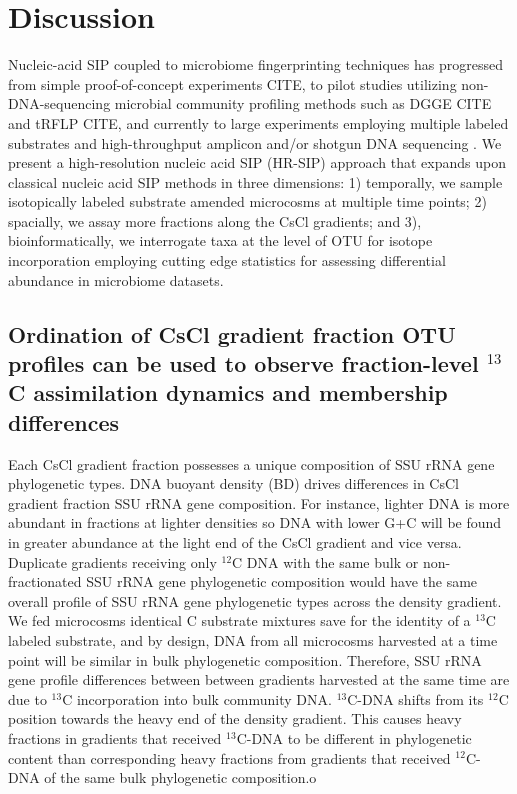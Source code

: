 \section{Discussion}
Nucleic-acid SIP coupled to microbiome fingerprinting techniques has progressed
from simple proof-of-concept experiments  CITE, to pilot studies utilizing
non-DNA-sequencing microbial community profiling methods such as DGGE CITE and
tRFLP CITE, and currently to large experiments employing multiple labeled
substrates and high-throughput amplicon and/or shotgun DNA sequencing
\citep{Verastegui_2014}. We present a high-resolution nucleic acid SIP (HR-SIP)
approach that expands upon classical nucleic acid SIP methods in three
dimensions: 1) temporally, we sample isotopically labeled substrate amended
microcosms at multiple time points; 2) spacially, we assay more fractions along
the CsCl gradients; and 3), bioinformatically, we interrogate taxa at the level
of OTU for isotope incorporation employing cutting edge statistics for
assessing differential abundance in microbiome datasets.

\subsection{Ordination of CsCl gradient fraction OTU profiles can be used to
observe fraction-level $^{13}$C assimilation dynamics and membership differences}
Each CsCl gradient fraction possesses a unique composition of SSU rRNA gene
phylogenetic types. DNA buoyant density (BD) drives differences in CsCl
gradient fraction SSU rRNA gene composition. For
instance, lighter DNA is more abundant in fractions at lighter densities so
DNA with lower G+C will be found in greater abundance at the light end of the
CsCl gradient and vice versa.  Duplicate gradients receiving only $^{12}$C DNA
with the same bulk or non-fractionated SSU rRNA gene phylogenetic composition 
would have the same overall profile of SSU rRNA gene phylogenetic types across 
the density gradient. We fed microcosms identical C substrate mixtures save 
for the identity of a $^{13}$C labeled substrate, and by design, DNA from all 
microcosms harvested at a time point will be similar in bulk phylogenetic 
composition. Therefore, SSU rRNA gene profile differences between between gradients 
harvested at the same time are due to $^{13}$C incorporation into bulk community DNA. 
$^{13}$C-DNA shifts from its $^{12}$C position towards the heavy end of the density gradient. This causes heavy fractions in gradients that received $^{13}$C-DNA to be different in
phylogenetic content than corresponding heavy fractions from gradients that
received $^{12}$C-DNA of the same bulk phylogenetic composition.o

